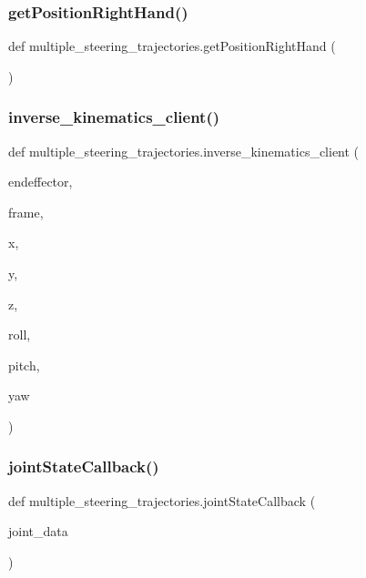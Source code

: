 \subsubsection{\texorpdfstring{getPositionRightHand()}{getPositionRightHand()}}
{\footnotesize\ttfamily def multiple\+\_\+steering\+\_\+trajectories.\+get\+Position\+Right\+Hand (\begin{DoxyParamCaption}{ }\end{DoxyParamCaption})}

\mbox{\label{namespacemultiple__steering__trajectories_a8d776c95f9bc7ef55e3e16f63534f31f}} 
\subsubsection{\texorpdfstring{inverse\_kinematics\_client()}{inverse\_kinematics\_client()}}
{\footnotesize\ttfamily def multiple\+\_\+steering\+\_\+trajectories.\+inverse\+\_\+kinematics\+\_\+client (\begin{DoxyParamCaption}\item[{}]{endeffector,  }\item[{}]{frame,  }\item[{}]{x,  }\item[{}]{y,  }\item[{}]{z,  }\item[{}]{roll,  }\item[{}]{pitch,  }\item[{}]{yaw }\end{DoxyParamCaption})}

\mbox{\label{namespacemultiple__steering__trajectories_a45c341c555b53c24083a5007b64fc97d}} 
\subsubsection{\texorpdfstring{jointStateCallback()}{jointStateCallback()}}
{\footnotesize\ttfamily def multiple\+\_\+steering\+\_\+trajectories.\+joint\+State\+Callback (\begin{DoxyParamCaption}\item[{}]{joint\+\_\+data }\end{DoxyParamCaption})}

